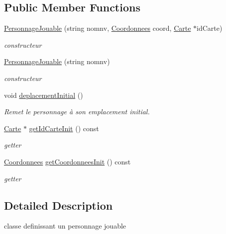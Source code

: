 \subsection*{Public Member Functions}
\begin{DoxyCompactItemize}
\item 
\hyperlink{classPersonnageJouable_a140604ca5b0fe1e38dd556ee3045f3cb}{Personnage\-Jouable} (string nomnv, \hyperlink{classCoordonnees}{Coordonnees} coord, \hyperlink{classCarte}{Carte} $\ast$id\-Carte)
\begin{DoxyCompactList}\small\item\em constructeur \end{DoxyCompactList}\item 
\hyperlink{classPersonnageJouable_a1bbbb6e3a1849dc226b8c2ab4bfa969c}{Personnage\-Jouable} (string nomnv)
\begin{DoxyCompactList}\small\item\em constructeur \end{DoxyCompactList}\item 
\hypertarget{classPersonnageJouable_a1ae6ed8c67f573a386ecd8b44c46c978}{void \hyperlink{classPersonnageJouable_a1ae6ed8c67f573a386ecd8b44c46c978}{deplacement\-Initial} ()}\label{classPersonnageJouable_a1ae6ed8c67f573a386ecd8b44c46c978}

\begin{DoxyCompactList}\small\item\em Remet le personnage à son emplacement initial. \end{DoxyCompactList}\item 
\hyperlink{classCarte}{Carte} $\ast$ \hyperlink{classPersonnageJouable_a9ba5eaf18bd33150acc3f042d34deb84}{get\-Id\-Carte\-Init} () const 
\begin{DoxyCompactList}\small\item\em getter \end{DoxyCompactList}\item 
\hyperlink{classCoordonnees}{Coordonnees} \hyperlink{classPersonnageJouable_a9ad36be16bae232f9c33478374143832}{get\-Coordonnees\-Init} () const 
\begin{DoxyCompactList}\small\item\em getter \end{DoxyCompactList}\end{DoxyCompactItemize}


\subsection{Detailed Description}
classe definissant un personnage jouable 

